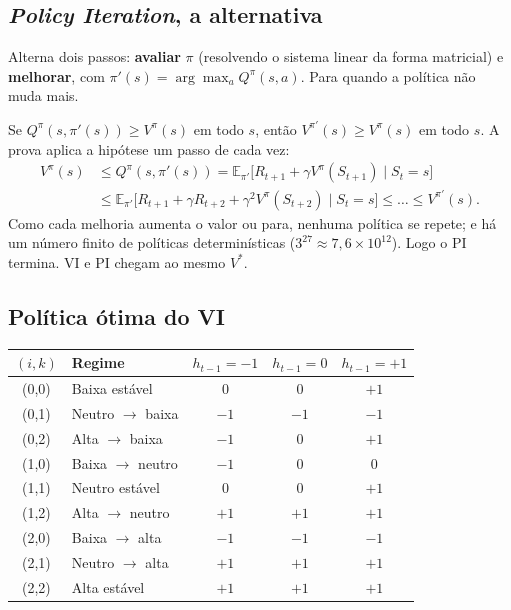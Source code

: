 \documentclass[11pt,a4paper]{article}
\newcommand{\bloco}[1]{\par\needspace{4\baselineskip}{\bfseries #1}\par\nopagebreak}
\begin{document}
\subsection{\textit{Policy Iteration}, a alternativa}

Alterna dois passos: \textbf{avaliar} $\pi$ (resolvendo o sistema linear da forma matricial) e \textbf{melhorar}, com $\pi'(s) = \arg\max_a Q^\pi(s,a)$. Para quando a política não muda mais.

\bloco{Teorema da melhoria}
Se $Q^\pi(s, \pi'(s)) \ge V^\pi(s)$ em todo $s$, então $V^{\pi'}(s) \ge V^\pi(s)$ em todo $s$. A prova aplica a hipótese um passo de cada vez:
\[
  \begin{aligned}
    V^\pi(s) &\le Q^\pi(s, \pi'(s)) = \mathbb{E}_{\pi'}\big[R_{t+1} + \gamma V^\pi(S_{t+1}) \mid S_t = s\big] \\
             &\le \mathbb{E}_{\pi'}\big[R_{t+1} + \gamma R_{t+2} + \gamma^2 V^\pi(S_{t+2}) \mid S_t = s\big]
              \le \dots \le V^{\pi'}(s).
  \end{aligned}
\]
Como cada melhoria aumenta o valor ou para, nenhuma política se repete; e há um número finito de políticas determinísticas ($3^{27} \approx 7{,}6 \times 10^{12}$). Logo o PI termina. VI e PI chegam ao mesmo $V^*$.

\subsection{Política ótima do VI}

\begin{center}
\small
\begin{tabular}{c l ccc}
  \toprule
  $(i,k)$ & Regime & $h_{t-1} = -1$ & $h_{t-1} = 0$ & $h_{t-1} = +1$ \\
  \midrule
  (0,0) & Baixa estável      & $0$  & $0$  & $+1$ \\
  (0,1) & Neutro $\to$ baixa & $-1$ & $-1$ & $-1$ \\
  (0,2) & Alta $\to$ baixa   & $-1$ & $0$  & $+1$ \\
  \midrule
  (1,0) & Baixa $\to$ neutro & $-1$ & $0$  & $0$  \\
  (1,1) & Neutro estável     & $0$  & $0$  & $+1$ \\
  (1,2) & Alta $\to$ neutro  & $+1$ & $+1$ & $+1$ \\
  \midrule
  (2,0) & Baixa $\to$ alta   & $-1$ & $-1$ & $-1$ \\
  (2,1) & Neutro $\to$ alta  & $+1$ & $+1$ & $+1$ \\
  (2,2) & Alta estável       & $+1$ & $+1$ & $+1$ \\
  \bottomrule
\end{tabular}
\end{center}
\end{document}
